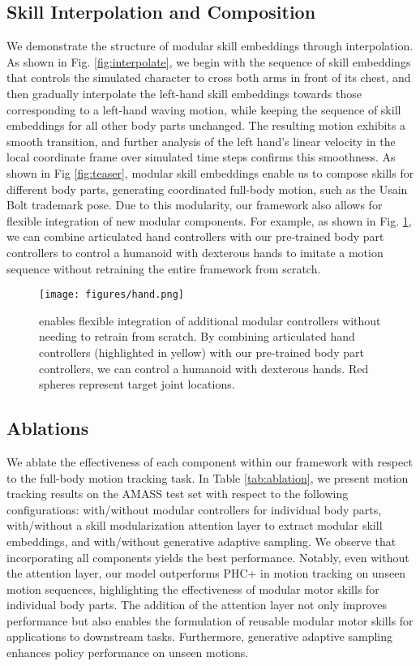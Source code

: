\subsection{Skill Interpolation and Composition}

We demonstrate the structure of modular skill embeddings through interpolation. As shown in Fig. \ref{fig:interpolate}, we begin with the sequence of skill embeddings that controls the simulated character to cross both arms in front of its chest, and then gradually interpolate the left-hand skill embeddings towards those corresponding to a left-hand waving motion, while keeping the sequence of skill embeddings for all other body parts unchanged. The resulting motion exhibits a smooth transition, and further analysis of the left hand's linear velocity in the local coordinate frame over simulated time steps confirms this smoothness. As shown in Fig \ref{fig:teaser}, modular skill embeddings enable us to compose skills for different body parts, generating coordinated full-body motion, such as the Usain Bolt trademark pose. Due to this modularity, our framework also allows for flexible integration of new modular components. For example, as shown in  Fig. \ref{fig:hand}, we can combine articulated hand controllers with our pre-trained body part controllers to control a humanoid with dexterous hands to imitate a motion sequence without retraining the entire framework from scratch.

\begin{figure}[htbp]
    \centering
    \texttt{[image: figures/hand.png]}
    \caption{\name enables flexible integration of additional modular controllers without needing to retrain from scratch. By combining articulated hand controllers (highlighted in yellow) with our pre-trained body part controllers, we can control a humanoid with dexterous hands. Red spheres represent target joint locations.}
    \label{fig:hand}
\end{figure}

\subsection{Ablations}

We ablate the effectiveness of each component within our framework with respect to the full-body motion tracking task. In Table \ref{tab:ablation}, we present motion tracking results on the AMASS test set with respect to the following configurations: with/without modular controllers for individual body parts, with/without a skill modularization attention layer to extract modular skill embeddings, and with/without generative adaptive sampling. We observe that incorporating all components yields the best performance. Notably, even without the attention layer, our model outperforms PHC+ in motion tracking on unseen motion sequences, highlighting the effectiveness of modular motor skills for individual body parts. The addition of the attention layer not only improves performance but also enables the formulation of reusable modular motor skills for applications to downstream tasks. Furthermore, generative adaptive sampling enhances policy performance on unseen motions.